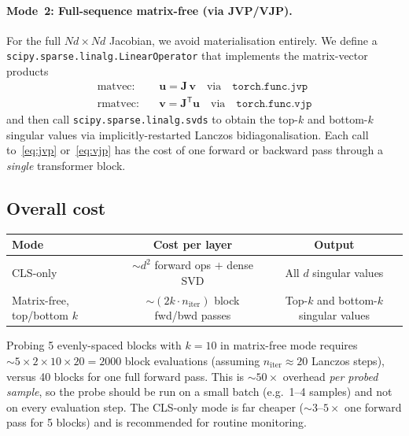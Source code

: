 \documentclass[11pt]{article}
\newcommand{\vect}[1]{\bm{#1}}
\newcommand{\mat}[1]{\mathbf{#1}}
\newcommand{\T}{\mathsf{T}}
\begin{document}
\paragraph{Mode~2: Full-sequence matrix-free (via JVP/VJP).}
For the full $Nd \times Nd$ Jacobian, we avoid materialisation entirely.
We define a \texttt{scipy.sparse.linalg.LinearOperator} that implements
the matrix-vector products
\begin{align}
    \text{matvec:}  & \quad \vect{u} = \mat{J}\,\vect{v}
        \quad\text{via}\quad \texttt{torch.func.jvp}
        \label{eq:jvp}\\
    \text{rmatvec:} & \quad \vect{v} = \mat{J}^\T\!\vect{u}
        \quad\text{via}\quad \texttt{torch.func.vjp}
        \label{eq:vjp}
\end{align}
and then call \texttt{scipy.sparse.linalg.svds} to obtain the top-$k$
and bottom-$k$ singular values via implicitly-restarted Lanczos
bidiagonalisation.  Each call to~\eqref{eq:jvp} or~\eqref{eq:vjp} has
the cost of one forward or backward pass through a \emph{single}
transformer block.

\subsection{Overall cost}

\begin{center}
\begin{tabular}{lcc}
\toprule
\textbf{Mode} & \textbf{Cost per layer} & \textbf{Output} \\
\midrule
CLS-only &
    $\sim\!d^2$ forward ops $+$ dense SVD &
    All $d$ singular values \\
Matrix-free, top/bottom $k$ &
    $\sim\!(2k \cdot n_{\text{iter}})$ block fwd/bwd passes &
    Top-$k$ and bottom-$k$ singular values \\
\bottomrule
\end{tabular}
\end{center}

Probing 5 evenly-spaced blocks with $k=10$ in matrix-free mode requires
$\sim\!5\times 2\times 10\times 20 = 2000$ block evaluations (assuming
$n_{\text{iter}}\approx 20$ Lanczos steps), versus 40 blocks for one
full forward pass.  This is $\sim\!50\times$ overhead \emph{per probed
sample}, so the probe should be run on a small batch (e.g.\ 1--4
samples) and not on every evaluation step.  The CLS-only mode is far
cheaper ($\sim\!3$--$5\times$ one forward pass for 5 blocks) and is
recommended for routine monitoring.
\end{document}
